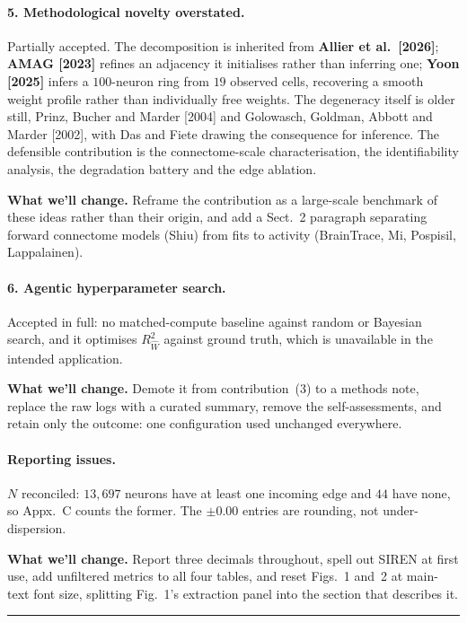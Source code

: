 \documentclass[11pt]{article}
\newcommand{\Rw}{R^2_{\widehat W}}
\begin{document}
\paragraph{5. Methodological novelty overstated.}
Partially accepted. The decomposition is inherited from \textbf{Allier et al.\
[2026]}; \textbf{AMAG [2023]} refines an adjacency it initialises rather than
inferring one; \textbf{Yoon [2025]} infers a
$100$-neuron ring from $19$ observed cells, recovering a smooth weight profile
rather than individually free weights. The degeneracy itself is older still,
Prinz, Bucher and Marder [2004] and Golowasch, Goldman, Abbott and Marder
[2002], with Das and Fiete drawing the consequence for inference. The defensible
contribution is the connectome-scale characterisation, the identifiability
analysis, the degradation battery and the edge ablation.

\textbf{What we'll change.} Reframe the contribution as a large-scale benchmark of
these ideas rather than their origin, and add a Sect.~2 paragraph separating
forward connectome models (Shiu) from fits to activity (BrainTrace, Mi,
Pospisil, Lappalainen).

\paragraph{6. Agentic hyperparameter search.}
Accepted in full: no matched-compute baseline against random or Bayesian search,
and it optimises $\Rw$ against ground truth, which is unavailable in the intended
application.

\textbf{What we'll change.} Demote it from contribution~(3) to a methods note,
replace the raw logs with a curated summary, remove the self-assessments, and
retain only the outcome: one configuration used unchanged everywhere.

\paragraph{Reporting issues.}
$N$ reconciled: $13{,}697$ neurons have at least one incoming edge and $44$ have
none, so Appx.~C counts the former. The $\pm 0.00$ entries are rounding, not
under-dispersion.

\textbf{What we'll change.} Report three decimals throughout, spell out SIREN at
first use, add unfiltered metrics to all four tables, and reset Figs.~1 and~2 at
main-text font size, splitting Fig.~1's extraction panel into the section that
describes it.

\bigskip
\hrule
\bigskip
\end{document}
